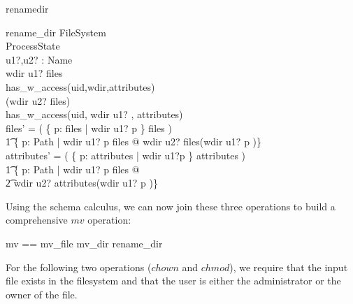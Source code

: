 \begin{doc}{renamedir}
 \begin{schema}{rename\_dir}
    \Delta FileSystem \\
    \Xi ProcessState \\
    u1?,u2? : Name \\
    \where
    wdir \cat \langle u1? \rangle \isdirin files \\
    has\_w\_access(uid,wdir,attributes) \\                                      

    \lnot (wdir \cat \langle u2? \rangle \isin files) \\

    has\_w\_access(uid, wdir \cat \langle u1? \rangle, attributes) \\

    files' = ( \{ p: \dom files | wdir \cat \langle u1? \rangle \prefix p \}
    \ndres files ) \\
    \t1 \oplus  \{ p: Path | wdir \cat \langle u1? \rangle \cat p \isin files @
    wdir \cat \langle u2? \rangle \mapsto files(wdir \cat \langle
    u1? \rangle \cat p )\} \\

    attributes' = ( \{ p: \dom attributes | wdir \cat \langle u1?\rangle \prefix p \}
    \ndres attributes ) \\
    \t1 \oplus  \{ p: Path | wdir \cat \langle u1? \rangle \cat p \isin files @
    \\
    \t2 wdir \cat \langle u2? \rangle \mapsto attributes(wdir \cat \langle
    u1? \rangle \cat p )\} \\
  \end{schema}
\end{doc}
Using the schema calculus, we can now join these three operations to build a
comprehensive $mv$ operation:
\begin{zed}
  mv == mv\_file \lor mv\_dir \lor rename\_dir \\
\end{zed}

For the following two operations ($chown$ and $chmod$), we require that the
input file exists in the filesystem and that the user is either the
administrator or the owner of the file.

